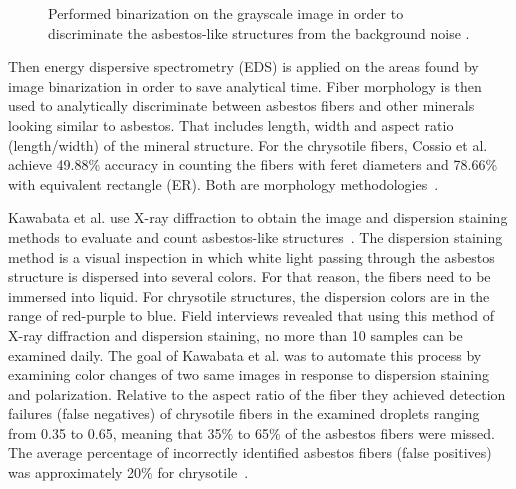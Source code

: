 \begin{figure}[h]
\centering
\caption{Performed binarization on the grayscale image in order to discriminate the asbestos-like structures from the background noise \cite{cossio2018innovative}. }
\label{fig:binarization}
\end{figure}

Then energy dispersive  spectrometry (EDS) is applied on the areas found by image binarization in order to save analytical time. Fiber morphology is then used to analytically discriminate between asbestos fibers and other minerals looking similar to asbestos. That includes length, width and aspect ratio (length/width) of the mineral structure. For the chrysotile fibers, Cossio et al. achieve 49.88\% accuracy in counting the fibers with feret diameters and 78.66\% with equivalent rectangle (ER). Both are morphology methodologies~\cite{cossio2018innovative}.

Kawabata et al. use X-ray diffraction to obtain the image and dispersion staining methods to evaluate and count asbestos-like structures~\cite{kawabata2009asbestos}. The dispersion staining method is a visual inspection in which white light passing through the asbestos structure is dispersed into several colors. For that reason, the fibers need to be immersed into liquid. For chrysotile structures, the dispersion colors are in the range of red-purple to blue. Field interviews revealed that using this method of X-ray diffraction and dispersion staining, no more than 10 samples can be examined daily. The goal of Kawabata et al. was to automate this process by examining color changes of two same images in response to dispersion staining and polarization. Relative to the aspect ratio of the fiber they achieved detection failures (false negatives) of chrysotile fibers in the examined droplets ranging from 0.35 to 0.65, meaning that 35\% to 65\% of the asbestos fibers were missed. The average percentage of incorrectly identified asbestos fibers (false positives) was approximately 20\% for chrysotile~\cite{kawabata2009asbestos}. 

